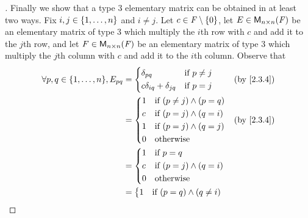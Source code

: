 \begin{proof}[]
	Finally we show that a type 3 elementary matrix can be obtained in at least two ways.
	Fix \(i, j \in \left\lbrace1, \dots, n\right\rbrace\) and \(i \neq j\).
	Let \(c \in \mathit{F} \setminus \left\lbrace0\right\rbrace\), let \(E \in \ms[n][n][\F]\) be an elementary matrix of type 3 which multiply the \(i\)th row with \(c\) and add it to the \(j\)th row, and let \(F \in \ms[n][n][\F]\) be an elementary matrix of type 3 which multiply the \(j\)th column with \(c\) and add it to the \(i\)th column.
	Observe that
	\begin{align*}
		\forall p, q \in \set{1, \dots, n}, E_{p q} & = \begin{dcases}
			                                                \delta_{p q}                  & \text{if } p \neq j \\
			                                                c \delta_{i q} + \delta_{j q} & \text{if } p = j
		                                                \end{dcases} &  & \by{2.3.4}                  \\
		                                            & = \begin{dcases}
			                                                1 & \text{if } (p \neq j) \land (p = q) \\
			                                                c & \text{if } (p = j) \land (q = i)    \\
			                                                1 & \text{if } (p = j) \land (q = j)    \\
			                                                0 & \text{otherwise}
		                                                \end{dcases}             &  & \by{2.3.4}                             \\
		                                            & = \begin{dcases}
			                                                1 & \text{if } p = q                 \\
			                                                c & \text{if } (p = j) \land (q = i) \\
			                                                0 & \text{otherwise}
		                                                \end{dcases}                                 \\
		                                            & = \begin{dcases}
			                                                1 & \text{if } (p = q) \land (q \neq i) \\

\end{dcases}
\end{align*}
\end{proof}
